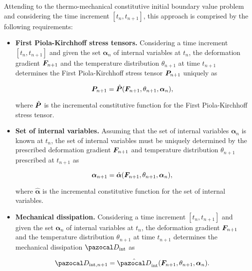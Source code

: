 Attending to the thermo-mechanical constitutive initial boundary value problem and considering the time increment $[t_n, t_{n+1}]$, this approach is comprised by the following requirements:
\begin{itemize}
    \item \textbf{First Piola-Kirchhoff stress tensors.} Considering a time increment $[t_n, t_{n+1}]$ and given the set $\bm \alpha_n$ of internal variables at $t_n$, the deformation gradient $\bm{F}_{n+1}$ and the temperature distribution \(\theta_{n+1}\) at time $t_{n+1}$ determines the First Piola-Kirchhoff stress tensor $\bm{P}_{n+1}$ uniquely as
    \begin{highlight}
      \begin{equation}
          \bm{P}_{n+1} = \hat{\bm{P}}(\bm{F}_{n+1}, \theta_{n+1}, \bm{\alpha}_n),
      \end{equation}
    \end{highlight}
    where $\hat{\bm{P}}$ is the incremental constitutive function for the First Piola-Kirchhoff stress tensor.
    \item \textbf{Set of internal variables.} Assuming that the set of internal variables $\bm \alpha_n$ is known at $t_n$, the set of internal variables must be uniquely determined by the prescribed deformation gradient $\bm{F}_{n+1}$ and temperature distribution \(\theta_{n+1}\) prescribed at $t_{n+1}$ as
    \begin{highlight}
        \begin{equation}
             \bm \alpha_{n+1} =\hat{\bm \alpha}(\bm{F}_{n+1}, \theta_{n+1}, \bm{\alpha}_n), \label{eq:incremental_flux}
        \end{equation}
    \end{highlight}
    where $\hat{\bm \alpha}$ is the incremental constitutive function for the set of internal variables.

    \item \textbf{Mechanical dissipation.}
 Considering a time increment $[t_n, t_{n+1}]$ and given the set $\bm \alpha_n$ of internal variables at $t_n$, the deformation gradient $\bm{F}_{n+1}$ and the temperature distribution \(\theta_{n+1}\) at time $t_{n+1}$ determines the mechanical dissipation \(\pazocal D_\text{int}\) as
    \begin{highlight}
    \begin{equation}
    \pazocal D_{\text{int},n+1} = \hat{\pazocal D}_\text{int}(\bm F_{n+1}, \theta_{n+1}, \bm \alpha_n).
    \end{equation}
    \end{highlight}


\end{itemize}
